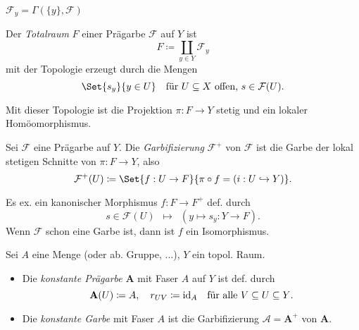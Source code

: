 \documentclass{cheat-sheet}
\newcommand{\Fais}{\mathcal{F}} %
\begin{document}
\begin{beob}
  $\Fais_y = \Gamma(\{y\}, \Fais)$
\end{beob}

\begin{defn}
  Der \emph{Totalraum} $F$ einer Prägarbe $\Fais$ auf $Y$ ist
  \[ F \coloneqq \coprod_{y \in Y} \Fais_y \]
  mit der Topologie erzeugt durch die Mengen
  \[
    \Set{s_y}{ y \in U } \quad
    \text{für $U \subseteq X$ offen, $s \in \Fais(U)$.}
  \]
\end{defn}

\begin{bem}
  Mit dieser Topologie ist die Projektion $\pi : F \to Y$ stetig und ein lokaler Homöomorphismus.
\end{bem}

\begin{defn}
  Sei $\Fais$ eine Prägarbe auf $Y$. Die \emph{Garbifizierung} $\Fais^+$ von $\Fais$ ist die Garbe der lokal stetigen Schnitte von $\pi : F \to Y$, also
  \[ \Fais^+(U) \coloneqq \Set{f : U \to F}{\pi \circ f = (i : U \hookrightarrow Y)}. \]
\end{defn}

\begin{prop}
  Es ex. ein kanonischer Morphismus $f : F \to F^+$ def. durch
  \[ s \in \Fais(U) \enspace \mapsto \enspace (y \mapsto s_y : Y \to F). \]
  Wenn $\Fais$ schon eine Garbe ist, dann ist $f$ ein Isomorphismus.
\end{prop}


\begin{defn}
  Sei $A$ eine Menge (oder ab. Gruppe, ...), $Y$ ein topol. Raum.
  \begin{itemize}
    \item Die \emph{konstante Prägarbe} $\mathbf{A}$ mit Faser $A$ auf $Y$ ist def. durch
    \[
      \mathbf{A}(U) \coloneqq A, \quad
      r_{UV} \coloneqq \mathrm{id}_A \quad
      \text{für alle $V \subseteq U \subseteq Y$.}
    \]
    \item Die \emph{konstante Garbe} mit Faser $A$ ist die Garbifizierung $\mathcal{A} = \mathbf{A}^+$ von $\mathbf{A}$.
  \end{itemize}
\end{defn}
\end{document}
